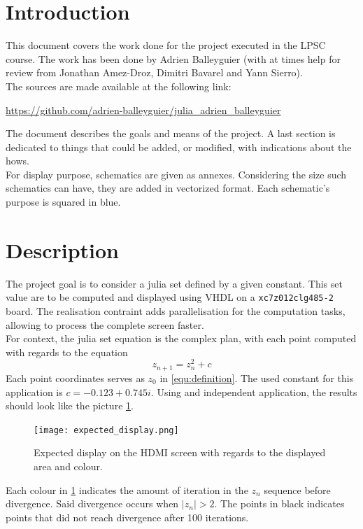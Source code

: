 \section{Introduction}
	This document covers the work done for the project executed in the LPSC course.
	The work has been done by Adrien Balleyguier (with at times help for review from Jonathan Amez-Droz, Dimitri Bavarel and Yann Sierro).\\
	The sources are made available at the following link:
	\begin{center}
		\href{https://github.com/adrien-balleyguier/julia_adrien_balleyguier}{https://github.com/adrien-balleyguier/julia\_adrien\_balleyguier}
	\end{center}
    The document describes the goals and means of the project.
    A last section is dedicated to things that could be added, or modified, with indications about the hows.\\
    For display purpose, schematics are given as annexes.
    Considering the size such schematics can have, they are added in vectorized format.
    Each schematic's purpose is squared in blue.
\section{Description}
    The project goal is to consider a julia set defined by a given constant.
    This set value are to be computed and displayed using VHDL on a \texttt{xc7z012clg485-2} board.
    The realisation contraint adds parallelisation for the computation tasks, allowing to process the complete screen
    faster.\\
    For context, the julia set equation is the complex plan, with each point computed with regards to the equation
    \begin{equation}\label{equ:definition}
        z_{n+1} = z_n^2 + c
    \end{equation}
    Each point coordinates serves as $z_0$ in \eqref{equ:definition}.
    The used constant for this application is $c=-0.123+0.745i$.
    Using and independent application, the results should look like the picture \ref{fig:expected_display}.
    \begin{figure}[H]
        \centering
        \texttt{[image: expected\_display.png]}
        \caption{Expected display on the HDMI screen with regards to the displayed area and colour.}
        \label{fig:expected_display}
    \end{figure}
    Each colour in \ref{fig:expected_display} indicates the amount of iteration in the $z_n$ sequence before divergence.
    Said divergence occurs when $|z_n| > 2$.
    The points in black indicates points that did not reach divergence after 100 iterations.
